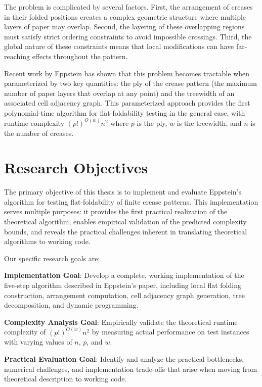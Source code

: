 The problem is complicated by several factors. First, the arrangement of creases in their folded positions creates a complex geometric structure where multiple layers of paper may overlap. Second, the layering of these overlapping regions must satisfy strict ordering constraints to avoid impossible crossings. Third, the global nature of these constraints means that local modifications can have far-reaching effects throughout the pattern.

Recent work by Eppstein has shown that this problem becomes tractable when parameterized by two key quantities: the ply of the crease pattern (the maximum number of paper layers that overlap at any point) and the treewidth of an associated cell adjacency graph. This parameterized approach provides the first polynomial-time algorithm for flat-foldability testing in the general case, with runtime complexity $(p!)^{O(w)}n^2$ where $p$ is the ply, $w$ is the treewidth, and $n$ is the number of creases.

\section{Research Objectives}

The primary objective of this thesis is to implement and evaluate Eppstein's algorithm for testing flat-foldability of finite crease patterns. This implementation serves multiple purposes: it provides the first practical realization of the theoretical algorithm, enables empirical validation of the predicted complexity bounds, and reveals the practical challenges inherent in translating theoretical algorithms to working code.

Our specific research goals are:

\textbf{Implementation Goal}: Develop a complete, working implementation of the five-step algorithm described in Eppstein's paper, including local flat folding construction, arrangement computation, cell adjacency graph generation, tree decomposition, and dynamic programming.

\textbf{Complexity Analysis Goal}: Empirically validate the theoretical runtime complexity of $(p!)^{O(w)}n^2$ by measuring actual performance on test instances with varying values of $n$, $p$, and $w$.

\textbf{Practical Evaluation Goal}: Identify and analyze the practical bottlenecks, numerical challenges, and implementation trade-offs that arise when moving from theoretical description to working code.

